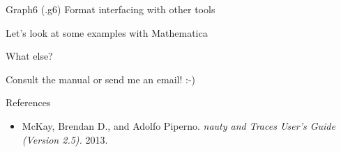 \documentclass{beamer}
\begin{document}

\begin{frame}[fragile] {Graph6 (.g6) Format}
{interfacing with other tools}

\bigskip

Let's look at some examples with Mathematica


\end{frame}


\begin{frame}[fragile] {What else?}
{}

Consult the manual or send me an email! :-)

\end{frame}


\begin{frame}{References}

\begin{itemize}
\item
McKay, Brendan D., and Adolfo Piperno. \emph{nauty and Traces User's Guide (Version 2.5).} 2013.
\end{itemize}
\end{frame}

\end{document}
